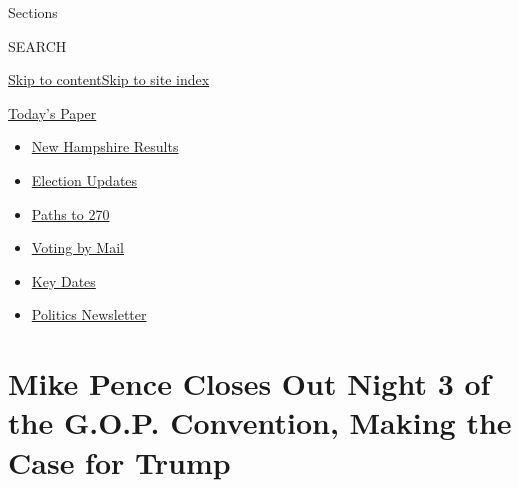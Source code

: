 Sections

SEARCH

\protect\hyperlink{site-content}{Skip to
content}\protect\hyperlink{site-index}{Skip to site index}

\href{https://myaccount.nytimes3xbfgragh.onion/auth/login?response_type=cookie\&client_id=vi}{}

\href{https://www.nytimes3xbfgragh.onion/section/todayspaper}{Today's
Paper}

\begin{itemize}
\item
  \href{https://www.nytimes3xbfgragh.onion/interactive/2020/09/08/us/elections/results-new-hampshire-primary-elections.html?action=click\&pgtype=Article\&state=default\&region=TOP_BANNER\&context=storylines_menu}{New
  Hampshire Results}
\item
  \href{https://www.nytimes3xbfgragh.onion/live/2020/09/08/us/trump-vs-biden?action=click\&pgtype=Article\&state=default\&region=TOP_BANNER\&context=storylines_menu}{Election
  Updates}
\item
  \href{https://www.nytimes3xbfgragh.onion/interactive/2020/us/elections/election-states-biden-trump.html?action=click\&pgtype=Article\&state=default\&region=TOP_BANNER\&context=storylines_menu}{Paths
  to 270}
\item
  \href{https://www.nytimes3xbfgragh.onion/interactive/2020/08/31/us/politics/vote-by-mail-deadlines.html?action=click\&pgtype=Article\&state=default\&region=TOP_BANNER\&context=storylines_menu}{Voting
  by Mail}
\item
  \href{https://www.nytimes3xbfgragh.onion/interactive/2019/us/elections/2020-presidential-election-calendar.html?action=click\&pgtype=Article\&state=default\&region=TOP_BANNER\&context=storylines_menu}{Key
  Dates}
\item
  \href{https://www.nytimes3xbfgragh.onion/newsletters/politics?action=click\&pgtype=Article\&state=default\&region=TOP_BANNER\&context=storylines_menu}{Politics
  Newsletter}
\end{itemize}

\hypertarget{mike-pence-closes-out-night-3-of-the-gop-convention-making-the-case-for-trump}{%
\section{Mike Pence Closes Out Night 3 of the G.O.P. Convention, Making
the Case for
Trump}\label{mike-pence-closes-out-night-3-of-the-gop-convention-making-the-case-for-trump}}

